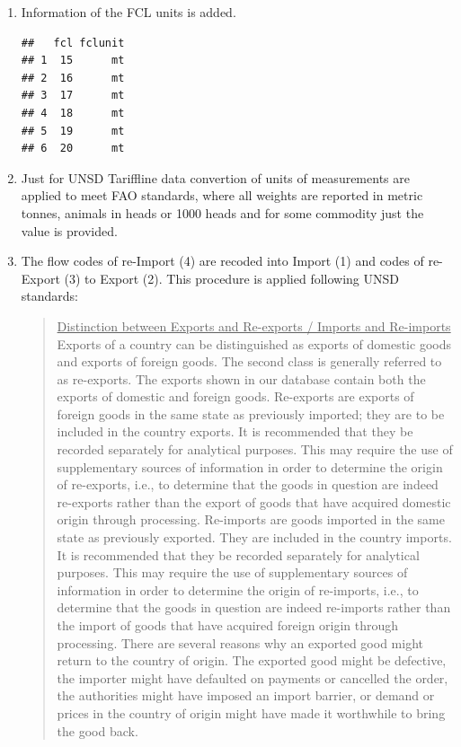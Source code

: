 \documentclass[nojss]{jss}\usepackage[]{graphicx}\usepackage[]{color}
\makeatletter
\newenvironment{kframe}{%
 \def\at@end@of@kframe{}%
 \ifinner\ifhmode%
  \def\at@end@of@kframe{\end{minipage}}%
  \begin{minipage}{\columnwidth}%
 \fi\fi%
 \def\FrameCommand##1{\hskip\@totalleftmargin \hskip-\fboxsep
 \colorbox{shadecolor}{##1}\hskip-\fboxsep
     \hskip-\linewidth \hskip-\@totalleftmargin \hskip\columnwidth}%
 \MakeFramed {\advance\hsize-\width
   \@totalleftmargin\z@ \linewidth\hsize
   \@setminipage}}%
 {\par\unskip\endMakeFramed%
 \at@end@of@kframe}
\newenvironment{knitrout}{}{} %
\makeatother
\begin{document}
\begin{itemize}
\begin{enumerate}
\item Information of the FCL units is added.
\begin{knitrout}
\color{fgcolor}\begin{kframe}
\begin{verbatim}
##   fcl fclunit
## 1  15      mt
## 2  16      mt
## 3  17      mt
## 4  18      mt
## 5  19      mt
## 6  20      mt
\end{verbatim}
\end{kframe}
\end{knitrout}

\item Just for UNSD Tariffline data convertion of units of measurements are applied to meet FAO standards, where all weights are reported in metric tonnes, animals in heads or 1000 heads and for some commodity just the value is provided.
\item The flow codes of re-Import (4) are recoded into Import (1) and codes of re-Export (3) to Export (2). This procedure is applied following UNSD standards:
\begin{quote}
\underline{Distinction between Exports and Re-exports / Imports and Re-imports}\\
Exports of a country can be distinguished as exports of domestic goods and exports of foreign goods. The second class is generally referred to as re-exports. The exports shown in our database contain both the exports of domestic and foreign goods. Re-exports are exports of foreign goods in the same state as previously imported; they are to be included in the country exports. It is recommended that they be recorded separately for analytical purposes. This may require the use of supplementary sources of information in order to determine the origin of re-exports, i.e., to determine that the goods in question are indeed re-exports rather than the export of goods that have acquired domestic origin through processing. Re-imports are goods imported in the same state as previously exported. They are included in the country imports. It is recommended that they be recorded separately for analytical purposes. This may require the use of supplementary sources of information in order to determine the origin of re-imports, i.e., to determine that the goods in question are indeed re-imports rather than the import of goods that have acquired foreign origin through processing. There are several reasons why an exported good might return to the country of origin. The exported good might be defective, the importer might have defaulted on payments or cancelled the order, the authorities might have imposed an import barrier, or demand or prices in the country of origin might have made it worthwhile to bring the good back.
\end{quote}
\end{enumerate}


\end{itemize}
\end{document}
